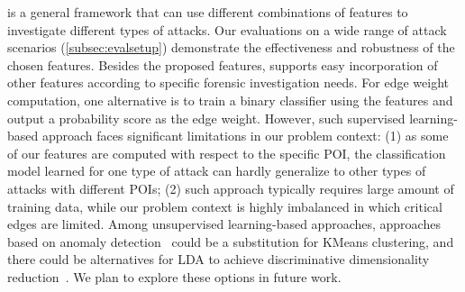 






%







\tool is a general framework that can use different combinations of features to investigate different types of attacks.
Our evaluations on a wide range of attack scenarios (\cref{subsec:evalsetup}) demonstrate the effectiveness and robustness of the chosen features.
Besides the proposed features, \tool supports easy incorporation of other features according to specific forensic investigation needs.
%
For edge weight computation, one alternative is to train a binary classifier using the features and output a probability score as the edge weight.
However, such supervised learning-based approach faces significant limitations in our problem context:
(1) as some of our features are computed with respect to the specific POI, the classification model learned for one type of attack can hardly generalize to other types of attacks with different POIs;
(2) such approach typically requires large amount of training data, while our problem context is highly imbalanced in which critical edges are limited. 
%
Among unsupervised learning-based approaches, approaches based on anomaly detection~\cite{anomalysurvey} could be a substitution for KMeans clustering, and there could be alternatives for LDA to achieve discriminative dimensionality reduction~\cite{Mika99fisherdiscriminant,sugiyama2006local}.
We plan to explore these options in future work.

